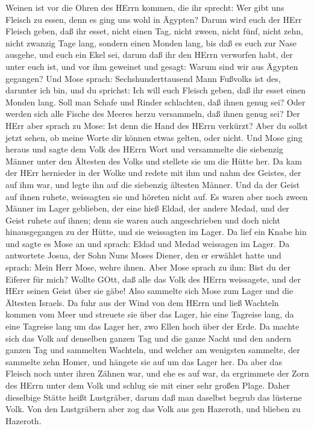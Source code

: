 Weinen ist vor die Ohren des HErrn kommen, die ihr sprecht: Wer gibt uns
Fleisch zu essen, denn es ging uns wohl in Ägypten? Darum wird euch der
HErr Fleisch geben, daß ihr esset,  nicht einen Tag, nicht
zween, nicht fünf, nicht zehn, nicht zwanzig Tage lang, 
sondern einen Monden lang, bis daß es euch zur Nase ausgehe, und euch
ein Ekel sei, darum daß ihr den HErrn verworfen habt, der unter euch
ist, und vor ihm geweinet und gesagt: Warum sind wir aus Ägypten
gegangen?  Und Mose sprach: Sechshunderttausend Mann
Fußvolks ist des, darunter ich bin, und du sprichst: Ich will euch
Fleisch geben, daß ihr esset einen Monden lang.  Soll man
Schafe und Rinder schlachten, daß ihnen genug sei? Oder werden sich alle
Fische des Meeres herzu versammeln, daß ihnen genug sei? 
Der HErr aber sprach zu Mose: Ist denn die Hand des HErrn verkürzt? Aber
du sollst jetzt sehen, ob meine Worte dir können etwas gelten, oder
nicht.  Und Mose ging heraus und sagte dem Volk des HErrn
Wort und versammelte die siebenzig Männer unter den Ältesten des Volks
und stellete sie um die Hütte her.  Da kam der HErr
hernieder in der Wolke und redete mit ihm und nahm des Geistes, der auf
ihm war, und legte ihn auf die siebenzig ältesten Männer. Und da der
Geist auf ihnen ruhete, weissagten sie und höreten nicht auf.
 Es waren aber noch zween Männer im Lager geblieben, der
eine hieß Eldad, der andere Medad, und der Geist ruhete auf ihnen; denn
sie waren auch angeschrieben und doch nicht hinausgegangen zu der Hütte,
und sie weissagten im Lager.  Da lief ein Knabe hin und
sagte es Mose an und sprach: Eldad und Medad weissagen im Lager.
 Da antwortete Josua, der Sohn Nuns Moses Diener, den er
erwählet hatte und sprach: Mein Herr Mose, wehre ihnen. 
Aber Mose sprach zu ihm: Bist du der Eiferer für mich? Wollte GOtt, daß
alle das Volk des HErrn weissagete, und der HErr seinen Geist über sie
gäbe!  Also sammelte sich Mose zum Lager und die Ältesten
Israels.  Da fuhr aus der Wind von dem HErrn und ließ
Wachteln kommen vom Meer und streuete sie über das Lager, hie eine
Tagreise lang, da eine Tagreise lang um das Lager her, zwo Ellen hoch
über der Erde.  Da machte sich das Volk auf denselben
ganzen Tag und die ganze Nacht und den andern ganzen Tag und sammelten
Wachteln, und welcher am wenigsten sammelte, der sammelte zehn Homer,
und hängete sie auf um das Lager her.  Da aber das Fleisch
noch unter ihren Zähnen war, und ehe es auf war, da ergrimmete der Zorn
des HErrn unter dem Volk und schlug sie mit einer sehr großen Plage.
 Daher dieselbige Stätte heißt Lustgräber, darum daß man
daselbst begrub das lüsterne Volk.  Von den Lustgräbern
aber zog das Volk aus gen Hazeroth, und blieben zu Hazeroth.

